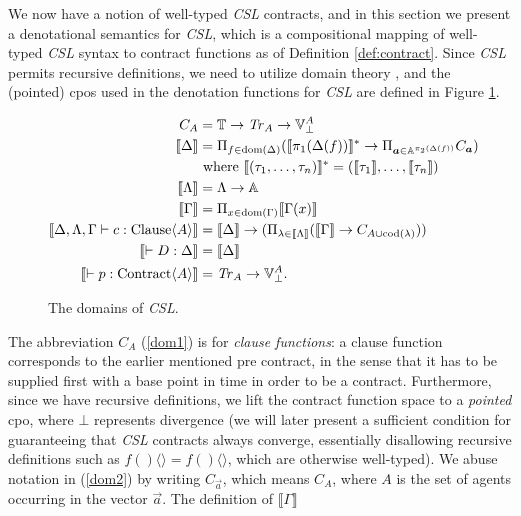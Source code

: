 \documentclass[orivec,final]{llncs-href}
\newcommand{\timeset}{\mathbb{T}}
\newcommand{\agentset}{\mathbb{A}}
\newcommand{\traceset}[1]{\mathit{Tr}_{#1}}
\newcommand{\verdictset}[1]{\mathbb{V}^{#1}}
\newcommand{\verdictsetlift}[1]{\verdictset{#1}_{\bot}}
\newcommand{\contractsetlift}[1]{\traceset{#1} \to \verdictsetlift{#1}}
\newcommand{\dom}[1]{\mathrm{dom}(#1)}
\newcommand{\cod}[1]{\mathrm{cod}(#1)}
\newcommand{\dendom}[1]{\llbracket #1 \rrbracket}
\newcommand{\dendomlift}[1]{\llbracket #1 \rrbracket^*}
\newcommand{\type}{\tau}
\newcommand{\csl}{\textit{CSL}}
\begin{document}
We now have a notion of well-typed \csl{} contracts, and in this
section we present a denotational semantics for \csl{}, which is a
compositional mapping of well-typed  \csl{} syntax to contract
functions as of Definition \ref{def:contract}. Since \csl{} permits
recursive definitions, we need to utilize domain theory
\cite{winskel93fsopl}, and the (pointed) cpos used in the denotation
functions for \csl{} are defined in Figure \ref{fig:domains}. 
\begin{figure}[b]
  \begin{align}
    C_A &= \timeset \to \contractsetlift{A}\label{dom1}\\
    \dendom{\Delta} &= \Pi_{f \in \dom{\Delta}}
    (\dendomlift{\pi_1(\Delta(f))} \to \Pi_{\vec{a} \in
      \agentset^{\pi_2(\Delta(f))}}C_{\vec{a}}) \label{dom2}\\
    & \mbox{ where }
    \dendomlift{(\type_1,\ldots,\type_n)} =
    (\dendom{\type_1},\ldots,\dendom{\type_n}) \notag\\
    \dendom{\Lambda} &= \Lambda \to \agentset \label{dom3}\\
    \dendom{\Gamma} &= \Pi_{x \in \dom{\Gamma}}
    \dendom{\Gamma(x)} \label{dom4}\\
    \dendom{\ctclause{\Delta}{\Lambda}{\Gamma}{c}{A}} &=
    \dendom{\Delta} \to (\Pi_{\lambda \in 
      \dendom{\Lambda}} (\dendom{\Gamma} \to C_{A \cup
      \cod{\lambda}})) \label{dom6}\\
    \dendom{\ctcontext{D}{\Delta}} &=
    \dendom{\Delta} \label{dom7}\\
    \dendom{\ctcontract{p}{A}} &= \contractsetlift{A} \label{dom8}.
  \end{align}
  \caption{The domains of \csl{}.}\label{fig:domains}
\end{figure}
The abbreviation $C_A$ (\ref{dom1}) is for \emph{clause functions}: a
clause function corresponds to the earlier mentioned pre contract, in the
sense that it has to be supplied first with a base point in time in
order to be a contract. Furthermore, since we have recursive definitions, we
lift the contract function space to a \emph{pointed} cpo, where $\bot$
represents divergence (we will later present a sufficient condition
for guaranteeing that \csl{} contracts always converge, essentially
disallowing recursive definitions such as $f()\langle\rangle =
f()\langle\rangle$, which are otherwise well-typed). We abuse
notation in (\ref{dom2}) by writing 
$C_{\vec{a}}$, which means $C_A$, where $A$ is the set of agents
occurring in the vector $\vec{a}$. The definition of $\dendom{\Gamma}$
\end{document}
